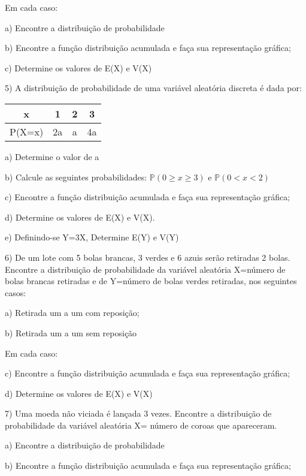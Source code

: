 \documentclass[12pt,a4paper]{article}
\begin{document}
Em cada caso:

a) Encontre a distribuição de probabilidade

b) Encontre a função distribuição acumulada e faça sua representação gráfica;

c) Determine os valores de E(X) e V(X)

\vspace{1cm}
5) A distribuição de probabilidade de uma variável aleatória discreta é dada por:

\begin{table}[h]
\centering
\begin{tabular}{|c|c|c|c|}\hline
x & 1 & 2 & 3\\\hline
P(X=x) & 2a & a & 4a\\\hline
\end{tabular}
\end{table}

a) Determine o valor de a

b) Calcule as seguintes probabilidades: $\mathbb{P}(0\geq{x}\geq{3})$ e $\mathbb{P}(0<x<2)$

c) Encontre a função distribuição acumulada e faça sua representação gráfica;

d) Determine os valores de E(X) e V(X).

e) Definindo-se Y=3X, Determine E(Y) e V(Y)

\vspace{1cm}
6) De um lote com 5 bolas brancas, 3 verdes e 6 azuis serão retiradas 2 bolas. Encontre a distribuição de probabilidade da variável aleatória X=número de bolas brancas retiradas e de Y=número de bolas verdes retiradas, nos seguintes casos:

a) Retirada um a um com reposição;

b) Retirada um a um sem reposição

Em cada caso:

c) Encontre a função distribuição acumulada e faça sua representação gráfica;

d) Determine os valores de E(X) e V(X)

\vspace{1cm}
7) Uma moeda não viciada é lançada 3 vezes. Encontre a distribuição de probabilidade da variável aleatória X= número de coroas que apareceram.

a) Encontre a distribuição de probabilidade

b)  Encontre a função distribuição acumulada e faça sua representação gráfica;
\end{document}
